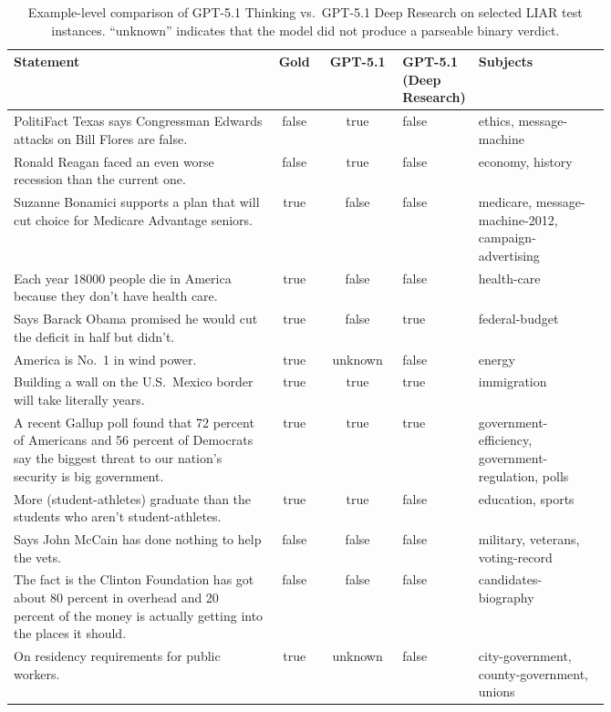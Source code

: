 \begin{table}[h]
\centering
\scriptsize
\setlength{\tabcolsep}{4pt}
\renewcommand{\arraystretch}{1.2}
\caption{Example-level comparison of GPT-5.1 Thinking vs.\ GPT-5.1 Deep Research 
on selected LIAR test instances. ``unknown'' indicates that the model did not 
produce a parseable binary verdict.}
\label{tab:gpt_deep_research_examples}
\begin{tabular}{p{0.44\linewidth} c c p{0.1\linewidth} p{0.22\linewidth}}
\toprule
Statement & Gold & GPT-5.1 & GPT-5.1 (Deep Research) & Subjects \\
\midrule
PolitiFact Texas says Congressman Edwards attacks on Bill Flores are false. &
false & true & false & ethics, message-machine \\
Ronald Reagan faced an even worse recession than the current one. &
false & true & false & economy, history \\
Suzanne Bonamici supports a plan that will cut choice for Medicare Advantage seniors. &
true & false & false & medicare, message-machine-2012, campaign-advertising \\
Each year 18000 people die in America because they don't have health care. &
true & false & false & health-care \\
Says Barack Obama promised he would cut the deficit in half but didn't. &
true & false & true & federal-budget \\
America is No.\ 1 in wind power. &
true & unknown & false & energy \\
Building a wall on the U.S.\ Mexico border will take literally years. &
true & true & true & immigration \\
A recent Gallup poll found that 72 percent of Americans and 56 percent of Democrats say the biggest threat to our nation's security is big government. &
true & true & true & government-efficiency, government-regulation, polls \\
More (student-athletes) graduate than the students who aren't student-athletes. &
true & true & false & education, sports \\
Says John McCain has done nothing to help the vets. &
false & false & false & military, veterans, voting-record \\
The fact is the Clinton Foundation has got about 80 percent in overhead and 20 percent of the money is actually getting into the places it should. &
false & false & false & candidates-biography \\
On residency requirements for public workers. &
true & unknown & false & city-government, county-government, unions \\

\end{tabular}
\end{table}

